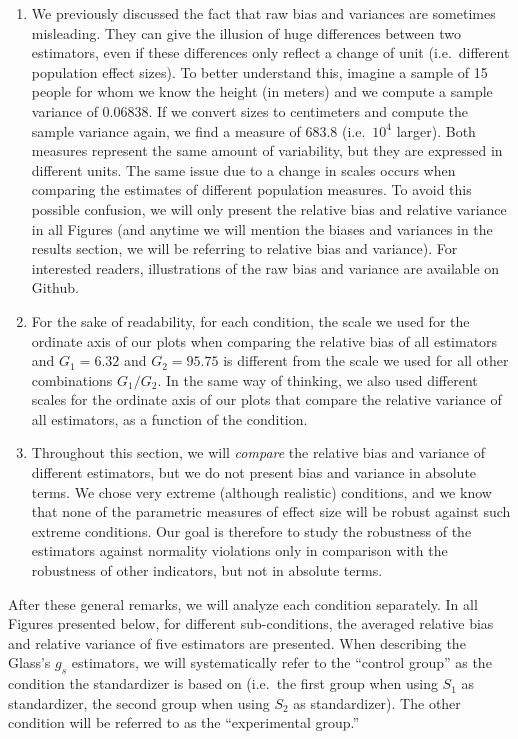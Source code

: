 \documentclass[
  english,
  man,floatsintext]{apa6}
\begin{document}
\begin{enumerate}
\def\labelenumi{\arabic{enumi})}
\item
  We previously discussed the fact that raw bias and variances are sometimes misleading. They can give the illusion of huge differences between two estimators, even if these differences only reflect a change of unit (i.e.~different population effect sizes). To better understand this, imagine a sample of 15 people for whom we know the height (in meters) and we compute a sample variance of 0.06838. If we convert sizes to centimeters and compute the sample variance again, we find a measure of 683.8 (i.e.~\(10^4\) larger). Both measures represent the same amount of variability, but they are expressed in different units. The same issue due to a change in scales occurs when comparing the estimates of different population measures. To avoid this possible confusion, we will only present the relative bias and relative variance in all Figures (and anytime we will mention the biases and variances in the results section, we will be referring to relative bias and variance). For interested readers, illustrations of the raw bias and variance are available on Github.
\item
  For the sake of readability, for each condition, the scale we used for the ordinate axis of our plots when comparing the relative bias of all estimators and \(G_1 = 6.32\) and \(G_2 = 95.75\) is different from the scale we used for all other combinations \(G_1/G_2\). In the same way of thinking, we also used different scales for the ordinate axis of our plots that compare the relative variance of all estimators, as a function of the condition.
\item
  Throughout this section, we will \emph{compare} the relative bias and variance of different estimators, but we do not present bias and variance in absolute terms. We chose very extreme (although realistic) conditions, and we know that none of the parametric measures of effect size will be robust against such extreme conditions. Our goal is therefore to study the robustness of the estimators against normality violations only in comparison with the robustness of other indicators, but not in absolute terms.
\end{enumerate}

After these general remarks, we will analyze each condition separately. In all Figures presented below, for different sub-conditions, the averaged relative bias and relative variance of five estimators are presented. When describing the Glass's \(g_s\) estimators, we will systematically refer to the ``control group'' as the condition the standardizer is based on (i.e.~the first group when using \(S_1\) as standardizer, the second group when using \(S_2\) as standardizer). The other condition will be referred to as the ``experimental group.''
\end{document}
